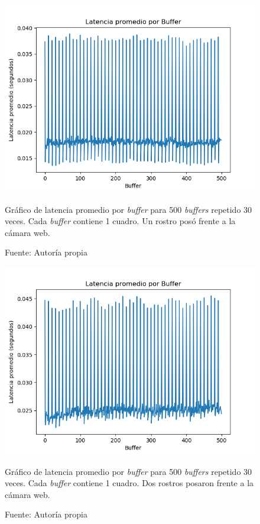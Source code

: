 \documentclass[a4paper,openright,12pt]{report}
\begin{document}
  \begin{figure}[!h]
    \centering
      \includegraphics[width=1.0\textwidth]{../images/latency-cheesefaceoverlay-1-faces.png}\par
    \caption{Gráfico de latencia promedio por \textit{buffer} para 500
             \textit{buffers} repetido 30 veces. Cada \textit{buffer}
             contiene 1 cuadro. Un rostro posó frente a la cámara web.}
      \label{fig:latency-cheesefaceoverlay-1-faces}
    \caption*{Fuente: Autoría propia}
  \end{figure}

  \begin{figure}[!h]
    \centering
      \includegraphics[width=1.0\textwidth]{../images/latency-cheesefaceoverlay-2-faces.png}\par
    \caption{Gráfico de latencia promedio por \textit{buffer} para 500
             \textit{buffers} repetido 30 veces. Cada \textit{buffer} contiene
             1 cuadro. Dos rostros posaron frente a la cámara web.}
      \label{fig:latency-cheesefaceoverlay-1-faces}
    \caption*{Fuente: Autoría propia}
  \end{figure}
\end{document}
